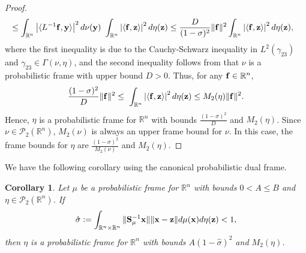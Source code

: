 \documentclass{amsart}
\numberwithin{equation}{section}
\theoremstyle{plain}
\newtheorem{corollary}[theorem]{Corollary}
\theoremstyle{definition}
\begin{document}
\begin{proof}
\begin{equation*}
\begin{split}
    & \leq \int_{\mathbb{R}^n} \left| \langle L^{-1}{\bf f}, {\bf y} \rangle \right|^2 d\nu({\bf y})  \ \int_{\mathbb{R}^n} \left|\langle {\bf f}, {\bf z} \rangle \right|^2 d\eta({\bf z})
   \leq  \frac{D}{(1- \sigma)^2} \Vert {\bf f} \Vert^2  \int_{\mathbb{R}^n} \left|\langle {\bf f}, {\bf z} \rangle \right|^2 d\eta({\bf z}),
\end{split}
\end{equation*}
where the first inequality is due to the Cauchy-Schwarz inequality in $L^2(\gamma_{23})$ and $\gamma_{23} \in \Gamma(\nu, \eta)$, and the second inequality follows from that $\nu$ is a probabilistic frame with upper bound $D>0$. Thus, for any ${\bf f} \in \mathbb{R}^n$, 
$$ \frac{(1- \sigma)^2}{D}    \Vert  {\bf f} \Vert^2  \leq  \ \int_{\mathbb{R}^n} \left|\langle {\bf f}, {\bf z} \rangle \right|^2 d\eta({\bf z}) \leq M_2(\eta) \Vert  {\bf f} \Vert^2.
$$
Hence, $\eta$ is a probabilistic frame for $\mathbb{R}^n$ with bounds $ \frac{(1- \sigma)^2}{D} $ and $M_2(\eta)$. Since $\nu \in \mathcal{P}_2(\mathbb{R}^n)$, $M_2(\nu)$ is always an upper frame bound for $\nu$.
 In this case, the frame bounds for $\eta$  are $ \frac{(1- \sigma)^2}{M_2(\nu)} $ and $M_2(\eta)$.
\end{proof}
    
We have the following corollary using the canonical probabilistic dual frame. 
\begin{corollary}\label{dualpeturbation}
     Let $\mu$ be a probabilistic frame for $\mathbb{R}^n$ with bounds $0<A \leq B$ and $\eta \in \mathcal{P}_2(\mathbb{R}^n)$. If 
 \begin{equation*}
       \hat{\sigma}:=  \int_{\mathbb{R}^n \times \mathbb{R}^n} \Vert  {\bf S}_\mu^{-1} {\bf x}\Vert 
     \Vert {\bf x}-{\bf z} \Vert  d \mu({\bf x}) d \eta({\bf z})<1,
 \end{equation*}
 then $\eta$ is a probabilistic frame for $\mathbb{R}^n$ with bounds $A(1- \hat{\sigma})^2 $ and $ M_2(\eta)$.
\end{corollary}
\end{document}
